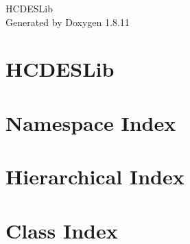 \documentclass[twoside]{book}
\newcommand{\+}{\discretionary{\mbox{\scriptsize$\hookleftarrow$}}{}{}}
\newcommand{\clearemptydoublepage}{%
  \newpage{\pagestyle{empty}\cleardoublepage}%
}
\begin{document}
\hypersetup{pageanchor=false,
             bookmarksnumbered=true,
             pdfencoding=unicode
            }
\begin{titlepage}
\vspace*{7cm}
\begin{center}%
{\Large H\+C\+D\+E\+S\+Lib }\\
\vspace*{1cm}
{\large Generated by Doxygen 1.8.11}\\
\end{center}
\end{titlepage}
\clearemptydoublepage
\tableofcontents
\clearemptydoublepage
{}
\hypersetup{pageanchor=true}

\chapter{H\+C\+D\+E\+S\+Lib}
\label{md_C:_Users_furian.MBI_Documents_Auckland_HCDESLib_README}
\hypertarget{md_C:_Users_furian.MBI_Documents_Auckland_HCDESLib_README}{}

\chapter{Namespace Index}

\chapter{Hierarchical Index}

\chapter{Class Index}

\end{document}
